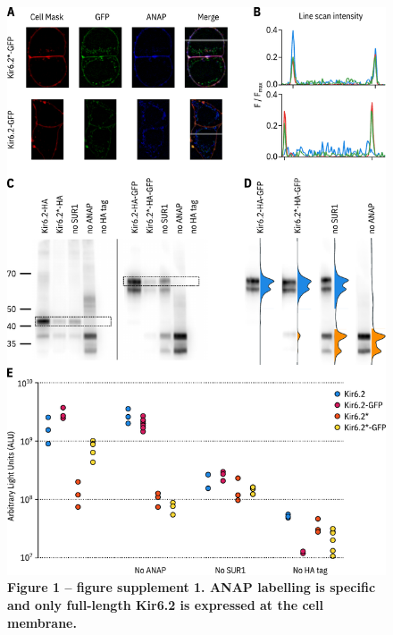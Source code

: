 \documentclass[10pt,lineno, doublespacing]{elife_modified}
\begin{document}
\begin{figure}
\begin{fullwidth}
\centering
\includegraphics[height=0.95\textheight]{figure_one_s1}
\captionsetup{labelformat=empty}
\caption{\textbf{Figure 1 -- figure supplement 1. ANAP labelling is specific and only full-length Kir6.2 is expressed at the cell membrane.}}
\label{fig:one_s1}
\end{fullwidth}
\end{figure}
\end{document}
